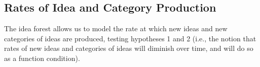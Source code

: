 



\subsection{Rates of Idea and Category Production}
The idea forest allows us to model the rate at which new ideas and new categories of ideas are produced, testing hypotheses 1 and 2 (i.e., the notion that rates of new ideas and categories of ideas will diminish over time, and will do so as a function condition).

